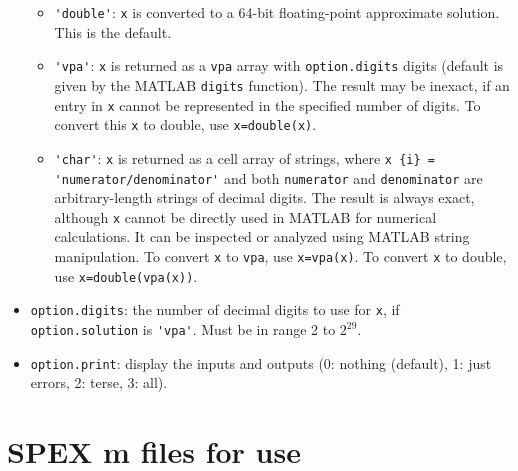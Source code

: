 \documentclass[12pt,oneside]{book}
\theoremstyle{definition}
\begin{document}
\begin{itemize}
    \begin{itemize}
        \item \verb|'double'|:  \verb|x| is converted to a 64-bit
            floating-point approximate solution.  This is the default.
        \item \verb|'vpa'|:  \verb|x| is returned as a \verb|vpa| array with
            \verb|option.digits| digits (default is given by the MATLAB
            \verb|digits| function).  The result may be inexact, if an entry in
            \verb|x| cannot be represented in the specified number of digits.
            To convert this \verb|x| to double, use \verb|x=double(x)|.
        \item \verb|'char'|:  \verb|x| is returned as a cell array of strings,
            where \verb|x {i} =| \newline \verb|'numerator/denominator'| and both
            \verb|numerator| and \verb|denominator| are arbitrary-length
            strings of decimal digits.  The result is always exact, although
            \verb|x| cannot be directly used in MATLAB for numerical
            calculations.  It can be inspected or analyzed using MATLAB string
            manipulation.  To convert \verb|x| to \verb|vpa|, use
            \verb|x=vpa(x)|.  To convert \verb|x| to double, use
            \verb|x=double(vpa(x))|.
    \end{itemize}

\item \verb|option.digits|: the number of decimal digits to use for \verb|x|, if
        \verb|option.solution| is \verb|'vpa'|.  Must be in range 2 to $2^{29}$.

\item \verb|option.print|: display the inputs and outputs
        (0: nothing (default), 1: just errors, 2: terse, 3: all).
\end{itemize}


\section{SPEX m files for use} \label{s:Use:MATLAB:factor}

\end{document}

